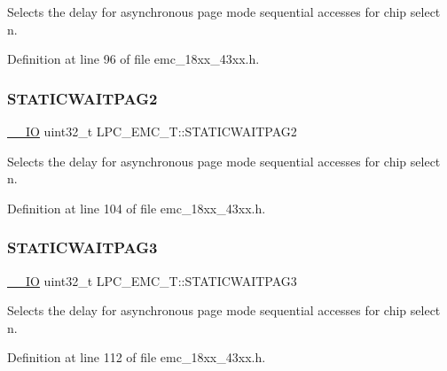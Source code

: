 Selects the delay for asynchronous page mode sequential accesses for chip select n. 

Definition at line 96 of file emc\+\_\+18xx\+\_\+43xx.\+h.

\mbox{\label{struct_l_p_c___e_m_c___t_a8934f373599c1f6aa0d12da1a29b5220}} 
\subsubsection{\texorpdfstring{S\+T\+A\+T\+I\+C\+W\+A\+I\+T\+P\+A\+G2}{STATICWAITPAG2}}
{\footnotesize\ttfamily \hyperlink{core__sc300_8h_aec43007d9998a0a0e01faede4133d6be}{\+\_\+\+\_\+\+IO} uint32\+\_\+t L\+P\+C\+\_\+\+E\+M\+C\+\_\+\+T\+::\+S\+T\+A\+T\+I\+C\+W\+A\+I\+T\+P\+A\+G2}

Selects the delay for asynchronous page mode sequential accesses for chip select n. 

Definition at line 104 of file emc\+\_\+18xx\+\_\+43xx.\+h.

\mbox{\label{struct_l_p_c___e_m_c___t_ae7bfd3776e4a6845862f6930fbfed2e6}} 
\subsubsection{\texorpdfstring{S\+T\+A\+T\+I\+C\+W\+A\+I\+T\+P\+A\+G3}{STATICWAITPAG3}}
{\footnotesize\ttfamily \hyperlink{core__sc300_8h_aec43007d9998a0a0e01faede4133d6be}{\+\_\+\+\_\+\+IO} uint32\+\_\+t L\+P\+C\+\_\+\+E\+M\+C\+\_\+\+T\+::\+S\+T\+A\+T\+I\+C\+W\+A\+I\+T\+P\+A\+G3}

Selects the delay for asynchronous page mode sequential accesses for chip select n. 

Definition at line 112 of file emc\+\_\+18xx\+\_\+43xx.\+h.

\mbox{\label{struct_l_p_c___e_m_c___t_a56424f914dc3578c5b4698d8bf6eeaa2}} 
